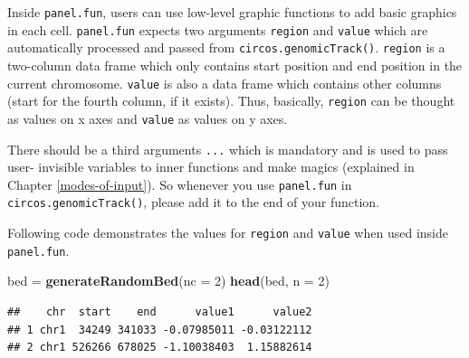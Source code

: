 \documentclass[]{book}
\newenvironment{Shaded}{\begin{snugshade}}{\end{snugshade}}
\newcommand{\KeywordTok}[1]{\textcolor[rgb]{0.13,0.29,0.53}{\textbf{#1}}}
\newcommand{\DataTypeTok}[1]{\textcolor[rgb]{0.13,0.29,0.53}{#1}}
\newcommand{\DecValTok}[1]{\textcolor[rgb]{0.00,0.00,0.81}{#1}}
\newcommand{\StringTok}[1]{\textcolor[rgb]{0.31,0.60,0.02}{#1}}
\newcommand{\OtherTok}[1]{\textcolor[rgb]{0.56,0.35,0.01}{#1}}
\newcommand{\ControlFlowTok}[1]{\textcolor[rgb]{0.13,0.29,0.53}{\textbf{#1}}}
\newcommand{\OperatorTok}[1]{\textcolor[rgb]{0.81,0.36,0.00}{\textbf{#1}}}
\newcommand{\NormalTok}[1]{#1}
\theoremstyle{definition}
\theoremstyle{definition}
\theoremstyle{remark}
\begin{document}
Inside \texttt{panel.fun}, users can use low-level graphic functions to
add basic graphics in each cell. \texttt{panel.fun} expects two
arguments \texttt{region} and \texttt{value} which are automatically
processed and passed from \texttt{circos.genomicTrack()}.
\texttt{region} is a two-column data frame which only contains start
position and end position in the current chromosome. \texttt{value} is
also a data frame which contains other columns (start for the fourth
column, if it exists). Thus, basically, \texttt{region} can be thought
as values on x axes and \texttt{value} as values on y axes.

There should be a third arguments \texttt{...} which is mandatory and is
used to pass user- invisible variables to inner functions and make
magics (explained in Chapter \ref{modes-of-input}). So whenever you use
\texttt{panel.fun} in \texttt{circos.genomicTrack()}, please add it to
the end of your function.

Following code demonstrates the values for \texttt{region} and
\texttt{value} when used inside \texttt{panel.fun}.

\begin{Shaded}
\begin{Highlighting}[]
\NormalTok{bed =}\StringTok{ }\KeywordTok{generateRandomBed}\NormalTok{(}\DataTypeTok{nc =} \DecValTok{2}\NormalTok{)}
\KeywordTok{head}\NormalTok{(bed, }\DataTypeTok{n =} \DecValTok{2}\NormalTok{)}
\end{Highlighting}
\end{Shaded}

\begin{verbatim}
##    chr  start    end      value1      value2
## 1 chr1  34249 341033 -0.07985011 -0.03122112
## 2 chr1 526266 678025 -1.10038403  1.15882614
\end{verbatim}

\begin{Shaded}
\end{Shaded}
\end{document}
